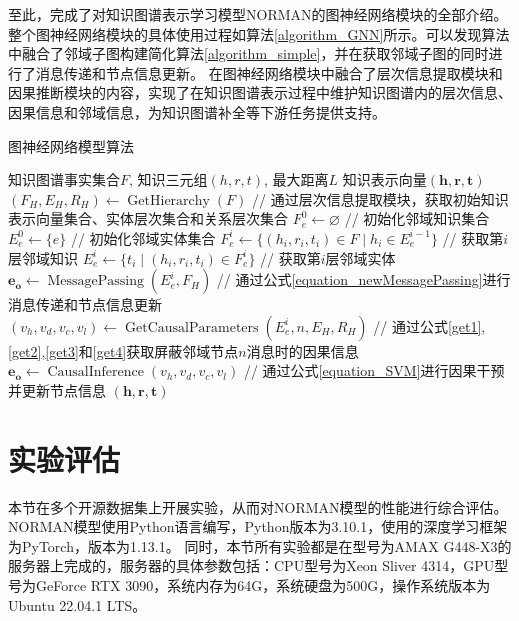 \documentclass[algorithmlist, AutoFakeBold, AutoFakeSlant, figurelist, tablelist, nomlist, engineering]{seuthesix}
\begin{document}
至此，完成了对知识图谱表示学习模型NORMAN的图神经网络模块的全部介绍。
整个图神经网络模块的具体使用过程如算法\ref{algorithm_GNN}所示。可以发现算法中融合了邻域子图构建简化算法\ref{algorithm_simple}，并在获取邻域子图的同时进行了消息传递和节点信息更新。
在图神经网络模块中融合了层次信息提取模块和因果推断模块的内容，实现了在知识图谱表示过程中维护知识图谱内的层次信息、因果信息和邻域信息，为知识图谱补全等下游任务提供支持。
\begin{algorithm}[t]
	\caption{图神经网络模型算法}  
	\label{algorithm_GNN}
	\begin{algorithmic}[1]
  \Require 知识图谱事实集合$F$, 知识三元组$(h, r, t)$, 最大距离$L$
  \Ensure 知识表示向量$(\bm{h}, \bm{r}, \bm{t})$
  \State $(F_H, E_H, R_H) \leftarrow \operatorname{GetHierarchy}(F)$ // 通过层次信息提取模块，获取初始知识表示向量集合、实体层次集合和关系层次集合
  \State $F_{e}^{0} \leftarrow \varnothing$ // 初始化邻域知识集合
  \State $E_{e}^{0} \leftarrow \{e\}$ // 初始化邻域实体集合
  \State $F_{e}^{i} \leftarrow \{(h_i, r_i, t_i) \in F \mid h_i \in E_{e}^{i-1}\}$ // 获取第$i$层邻域知识
  \State $E_{e}^{i} \leftarrow \{t_i \mid (h_i, r_i, t_i) \in F_{e}^{i}\}$ // 获取第$i$层邻域实体
  \State $\bm{e_o} \leftarrow \operatorname{MessagePassing}(E_{e}^{i}, F_H)$ // 通过公式\ref{equation_newMessagePassing}进行消息传递和节点信息更新
  \State $(v_h, v_d, v_c, v_l) \leftarrow \operatorname{GetCausalParameters}(E_{e}^{i}, n, E_H, R_H)$ 
  \State // 通过公式\ref{get1},\ref{get2},\ref{get3}和\ref{get4}获取屏蔽邻域节点$n$消息时的因果信息
  \State $\bm{e_o} \leftarrow \operatorname{CausalInference}(v_h, v_d, v_c, v_l)$ 
  \State // 通过公式\ref{equation_SVM}进行因果干预并更新节点信息
  \EndFor
  \EndFor
  \EndFor
  \State \Return $(\bm{h}, \bm{r}, \bm{t})$
	\end{algorithmic}
\end{algorithm} 


\section{实验评估}
本节在多个开源数据集上开展实验，从而对NORMAN模型的性能进行综合评估。
NORMAN模型使用Python语言编写，Python版本为3.10.1，使用的深度学习框架为PyTorch，版本为1.13.1。
同时，本节所有实验都是在型号为AMAX G448-X3的服务器上完成的，服务器的具体参数包括：CPU型号为Xeon Sliver 4314，GPU型号为GeForce RTX 3090，系统内存为64G，系统硬盘为500G，操作系统版本为Ubuntu 22.04.1 LTS。
\end{document}
